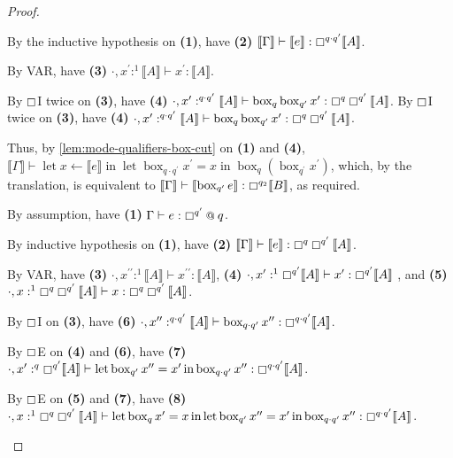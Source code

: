 \documentclass[acmsmall,screen,nonacm]{acmart}
\makeatletter
\DeclareMathOperator{\llet}{\text{let}}
\DeclareMathOperator{\lin}{\text{in}}
\DeclareMathOperator{\bbox}{\text{box}}
\newcommand{\at}{\mathbin{\mbox{\small\ensuremath{@}}}}
\newcommand{\tee}{\vdash}
\newcommand{\sem}[1]{\llbracket #1 \rrbracket}
\makeatother
\begin{document}
\begin{proof}
\begin{description}
    By the inductive hypothesis on \textbf{(1)}, have \textbf{(2)} $\sem{\Gamma} \tee \sem{e} : \boxempty^{q \cdot q^\prime} \sem{A}$.
    
    By VAR, have \textbf{(3)} $\cdot, x^\prime :^1 \sem{A} \tee x^\prime : \sem{A}$.

    By $\boxempty$I twice on \textbf{(3)}, have \textbf{(4)} $\cdot, x^\prime :^{q \cdot q^\prime} \sem{A} \tee \bbox_q \bbox_{q^\prime} x^\prime : \boxempty^q \boxempty^{q^\prime} \sem{A}$.
    By $\boxempty$I twice on \textbf{(3)}, have \textbf{(4)} $\cdot, x^\prime :^{q \cdot q^\prime} \sem{A} \tee \bbox_q \bbox_{q^\prime} x^\prime : \boxempty^q \boxempty^{q^\prime} \sem{A}$.
    
    Thus, by \ref{lem:mode-qualifiers-box-cut} on \textbf{(1)} and \textbf{(4)}, $\sem{\Gamma} \tee \llet x \leftarrow \sem{e} \lin \llet \bbox_{q \cdot q^\prime} x^\prime = x \lin \bbox_q (\bbox_{q^\prime} x^\prime)$, which, by the translation, is equivalent to $\sem{\Gamma} \tee \sem{\bbox_{q^\prime} e} : \boxempty^{q_2} \sem{B}$, as required.
    \\
    \item[Case $\boxempty$E.]
    By assumption, have \textbf{(1)} $\Gamma \tee e : \boxempty^{q^\prime} \at q$.
    
    By inductive hypothesis on \textbf{(1)}, have \textbf{(2)} $\sem{\Gamma} \tee \sem{e} : \boxempty^q \boxempty^{q^\prime} \sem{A}$.

    By VAR, have \textbf{(3)} $\cdot, x^{\prime\prime} :^1 \sem{A} \tee x^{\prime\prime} : \sem{A}$, \textbf{(4)} $\cdot, x^\prime :^1 \boxempty^{q^\prime} \sem{A} \tee x^\prime : \boxempty^{q^\prime} \sem{A}$ , and \textbf{(5)} $\cdot, x :^1 \boxempty^q \boxempty^{q^\prime} \sem{A} \tee x : \boxempty^q \boxempty^{q^\prime} \sem{A}$.

    By $\boxempty$I on \textbf{(3)}, have \textbf{(6)} $\cdot, x^{\prime\prime} :^{q \cdot q^\prime} \sem{A} \tee \bbox_{q \cdot q^\prime} x^{\prime\prime} : \boxempty^{q \cdot q^\prime} \sem{A}$.
    
    By $\boxempty$E on \textbf{(4)} and \textbf{(6)}, have \textbf{(7)} $\cdot, x^\prime :^q \boxempty^{q^\prime} \sem{A} \tee \llet \bbox_{q^\prime} x^{\prime\prime} = x^\prime \lin \bbox_{q \cdot q^\prime} x^{\prime\prime} : \boxempty^{q \cdot q^\prime} \sem{A}$.
    
    By $\boxempty$E on \textbf{(5)} and \textbf{(7)}, have \textbf{(8)} $\cdot, x :^1 \boxempty^q \boxempty^{q^\prime} \sem{A} \tee \llet \bbox_q x^\prime = x \lin \llet \bbox_{q^\prime} x^{\prime\prime} = x^\prime \lin \bbox_{q \cdot q^\prime} x^{\prime\prime} : \boxempty^{q \cdot q^\prime} \sem{A}$.
    

\end{description}
\end{proof}
\end{document}
